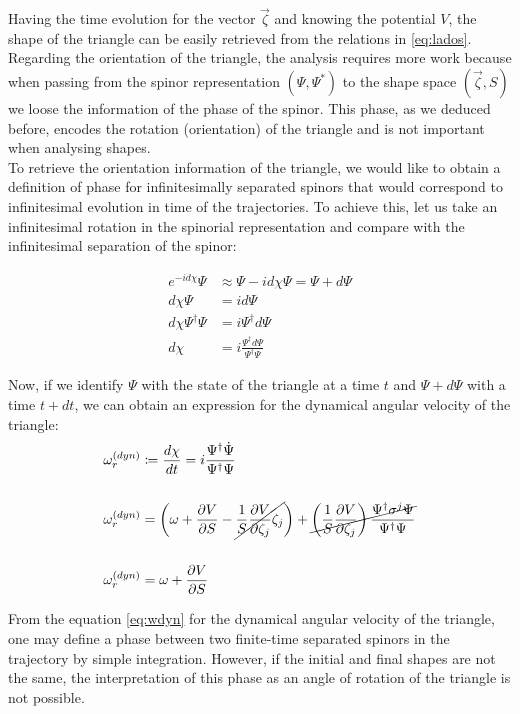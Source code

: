 Having the time evolution for the vector $\vec{\zeta}$ and knowing the potential $V$, the shape of the triangle can be easily retrieved from the relations in \eqref{eq:lados}. Regarding the orientation of the triangle, the analysis requires more work because when passing from the spinor representation $(\Psi,\Psi^*)$ to the shape space $(\vec{\zeta},S)$ we loose the information of the phase of the spinor. This phase, as we deduced before, encodes the rotation (orientation) of the triangle and is not important when analysing shapes.\\

To retrieve the orientation information of the triangle, we would like to obtain a definition of phase for infinitesimally separated spinors that would correspond to infinitesimal evolution in time of the trajectories. To achieve this, let us take an infinitesimal rotation in the spinorial representation and compare with the infinitesimal separation of the spinor:

\begin{align*}
e^{-id\chi}\Psi &\approx \Psi -id\chi\Psi = \Psi + d\Psi\\
d\chi\Psi &= id\Psi \\
d\chi\Psi^\dagger\Psi &= i\Psi^\dagger d\Psi\\
d\chi &= i\frac{\Psi^\dagger d\Psi}{\Psi^\dagger\Psi}
\end{align*}

Now, if we identify $\Psi$ with the state of the triangle at a time $t$ and $\Psi+d\Psi$ with a time $t+dt$, we can obtain an expression for the dynamical angular velocity of the triangle:\\

\begin{align}
\omega_r^{(dyn)} &\coloneqq \frac{d\chi}{dt} = i\frac{\Psi^\dagger\dot{\Psi}}{\Psi^\dagger\Psi}\nonumber\\
\nonumber\\
\omega_r^{(dyn)}&= \left( \omega +\frac{\partial V}{\partial S}-\cancel{\frac{1}{S}\frac{\partial V}{\partial \zeta_j}\zeta_j} \right) + \cancel{\left( \frac{1}{S}\frac{\partial V}{\partial \zeta_j} \right)\frac{ \Psi^\dagger \sigma^j\Psi}{\Psi^\dagger \Psi}}\nonumber\\
\nonumber\\
\omega_r^{(dyn)} &= \omega + \frac{\partial V}{\partial S}
\label{eq:wdyn}
\end{align}

From the equation \eqref{eq:wdyn} for the dynamical angular velocity of the triangle, one may define a phase between two finite-time separated spinors in the trajectory by simple integration. However, if the initial and final shapes are not the same, the interpretation of this phase as an angle of rotation of the triangle is not possible.\\

